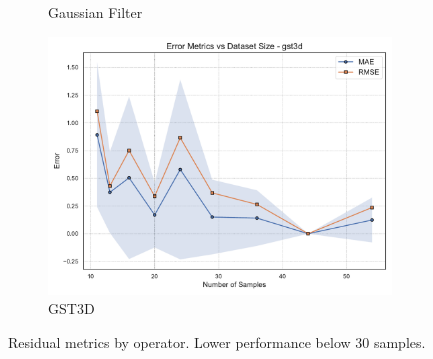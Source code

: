\begin{figure}[htbp]
\begin{subfigure}[t]{0.32\textwidth}
        \caption{Gaussian Filter}
    \end{subfigure}
    \hfill
    \begin{subfigure}[t]{0.32\textwidth}
        \includegraphics[width=\textwidth]{assets/images/05/residual_metrics_by_sample_size_gst3d}
        \caption{\ac{GST3D}}
    \end{subfigure}
    \caption{Residual metrics by operator. Lower performance below 30 samples.}
    \label{fig:residual_metrics_by_sample_size_operators}
\end{figure}

